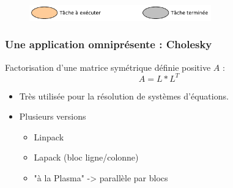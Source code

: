 \documentclass[xcolor={usenames,dvipsnames,svgnames,table}, aspectratio=43]{beamer}
\begin{document}
\begin{frame}
\begin{figure}
{    }%
  \end{figure}
  \begin{figure}
    \centering
    \includegraphics[width=0.7\textwidth]{graph/anim-peag/peage-analogie-legend.pdf}%
  \end{figure}
\end{frame}

\begin{frame}
\frametitle{Une application omniprésente : Cholesky}

Factorisation d'une matrice symétrique définie positive $A$ :
$$ A = L*L^T$$

\begin{itemize}
\item Très utilisée pour la résolution de systèmes d'équations.

\item Plusieurs versions

  \begin{itemize}
    \item Linpack
    \item Lapack (bloc ligne/colonne)
    \item "à la Plasma" -> parallèle par blocs
  \end{itemize}
\end{itemize}

\end{frame}
\end{document}
